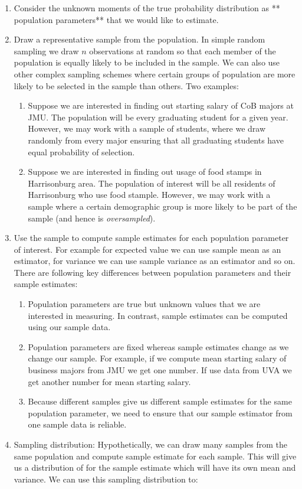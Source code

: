 \documentclass[
]{book}
\theoremstyle{definition}
\theoremstyle{definition}
\theoremstyle{definition}
\theoremstyle{definition}
\theoremstyle{remark}
\begin{document}
\begin{enumerate}
\def\labelenumi{\arabic{enumi}.}
\item
  Consider the unknown moments of the true probability distribution as ** population parameters** that we would like to estimate.
\item
  Draw a representative sample from the population. In simple random sampling we draw \(n\) observations at random so that each member of the population is equally likely to be included in the sample. We can also use other complex sampling schemes where certain groups of population are more likely to be selected in the sample than others. Two examples:

  \begin{enumerate}
  \def\labelenumii{\alph{enumii}.}
  \item
    Suppose we are interested in finding out starting salary of CoB majors at JMU. The population will be every graduating student for a given year. However, we may work with a sample of students, where we draw randomly from every major ensuring that all graduating students have equal probability of selection.
  \item
    Suppose we are interested in finding out usage of food stamps in Harrisonburg area. The population of interest will be all residents of Harrisonburg who use food stample. However, we may work with a sample where a certain demographic group is more likely to be part of the sample (and hence is \emph{oversampled}).
  \end{enumerate}
\item
  Use the sample to compute sample estimates for each population parameter of interest. For example for expected value we can use sample mean as an estimator, for variance we can use sample variance as an estimator and so on. There are following key differences between population parameters and their sample estimates:

  \begin{enumerate}
  \def\labelenumii{\alph{enumii}.}
  \item
    Population parameters are true but unknown values that we are interested in measuring. In contrast, sample estimates can be computed using our sample data.
  \item
    Population parameters are fixed whereas sample estimates change as we change our sample. For example, if we compute mean starting salary of business majors from JMU we get one number. If use data from UVA we get another number for mean starting salary.
  \item
    Because different samples give us different sample estimates for the same population parameter, we need to ensure that our sample estimator from one sample data is reliable.
  \end{enumerate}
\item
  Sampling distribution: Hypothetically, we can draw many samples from the same population and compute sample estimate for each sample. This will give us a distribution of for the sample estimate which will have its own mean and variance. We can use this sampling distribution to:


\end{enumerate}
\end{document}

